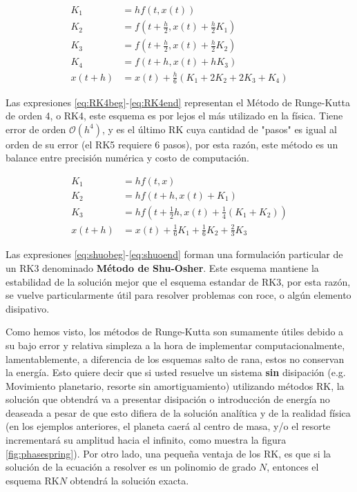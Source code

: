 \begin{align}
  K_{1} &= hf(t, x(t)) \label{eq:RK4beg} \\
  K_{2} &= f(t + \frac{h}{2}, x(t) + \frac{h}{2}K_{1}) \\
  K_{3} &= f(t + \frac{h}{2}, x(t) + \frac{h}{2}K_{2}) \\
  K_{4} &= f(t+ h, x(t) +hK_{3}) \\
  x(t + h) &= x(t) +\frac{h}{6}(K_{1} + 2K_{2} + 2K_{3} + K_{4}) \label{eq:RK4end}
\end{align}

Las expresiones \eqref{eq:RK4beg}-\eqref{eq:RK4end} representan el Método de Runge-Kutta de orden 4, o RK4, este esquema es por lejos el más utilizado en la física. Tiene error de orden $\mathcal{O}(h^{4})$, y es el último RK cuya cantidad de "pasos" es igual al orden de su error (el RK5 requiere 6 pasos), por esta razón, este método es un balance entre precisión numérica y costo de computación.

\begin{align}
  K_{1} &= hf(t, x) \label{eq:shuobeg} \\
  K_{2} &= hf(t + h, x(t) + K_{1}) \\
  K_{3} &= hf(t + \frac{1}{2}h, x(t) + \frac{1}{4}(K_{1} + K_{2})) \\
  x(t+h) &= x(t) + \frac{1}{6}K_{1} + \frac{1}{6}K_{2} + \frac{2}{3}K_{3} \label{eq:shuoend}
\end{align}

Las expresiones \eqref{eq:shuobeg}-\eqref{eq:shuoend} forman una formulación particular de un RK3 denominado \textbf{Método de Shu-Osher}. Este esquema mantiene la estabilidad de la solución mejor que el esquema estandar de RK3, por esta razón, se vuelve particularmente útil para resolver problemas con roce, o algún elemento disipativo.

Como hemos visto, los métodos de Runge-Kutta son sumamente útiles debido a su bajo error y relativa simpleza a la hora de implementar computacionalmente, lamentablemente, a diferencia de los esquemas salto de rana, estos no conservan la energía. Esto quiere decir que si usted resuelve un sistema \textbf{sin} disipación (e.g. Movimiento planetario, resorte sin amortiguamiento) utilizando métodos RK, la solución que obtendrá va a presentar disipación o introducción de energía no deaseada a pesar de que esto difiera de la solución analítica y de la realidad física (en los ejemplos anteriores, el planeta caerá al centro de masa, y/o el resorte incrementará su amplitud hacia el infinito, como muestra la figura \ref{fig:phasespring}). Por otro lado, una pequeña ventaja de los RK, es que si la solución de la ecuación a resolver es un polinomio de grado $N$, entonces el esquema RK$N$ obtendrá la solución exacta. 

